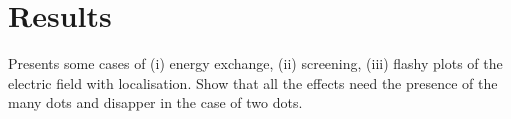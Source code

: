 \section{Results}
Presents some cases of (i) energy exchange, (ii) screening, (iii) flashy plots of the electric field with localisation.
Show that all the effects need the presence of the many dots and disapper in the case of two dots.
